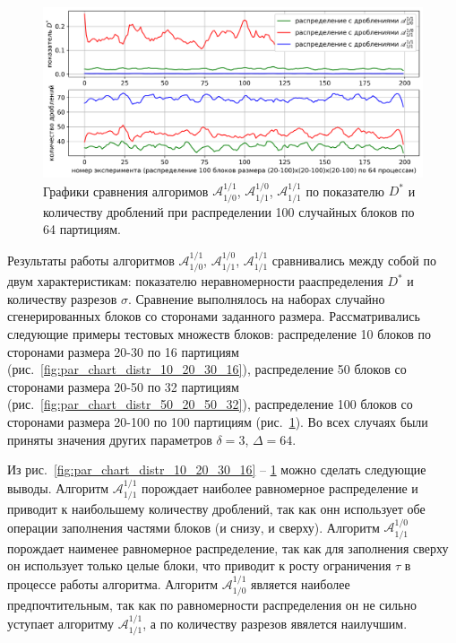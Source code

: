 \begin{figure}[!h]
\centering
\includegraphics[width=1.0\textwidth]{fig/par_chart_distr_100_20_100_64.png}
\singlespacing
{}\caption{Графики сравнения алгоримов $\mathscr{A}_{1/0}^{1/1}$, $\mathscr{A}_{1/1}^{1/0}$, $\mathscr{A}_{1/1}^{1/1}$ по показателю $D^{*}$ и количеству дроблений при распределении 100 случайных блоков по 64 партициям.}
\label{fig:par_chart_distr_100_20_100_64}
\end{figure}

Результаты работы алгоритмов $\mathscr{A}_{1/0}^{1/1}$, $\mathscr{A}_{1/1}^{1/0}$, $\mathscr{A}_{1/1}^{1/1}$ сравнивались между собой по двум характеристикам: показателю неравномерности рааспределения $D^{*}$ и количеству разрезов $\sigma$.
Сравнение выполнялось на наборах случайно сгенерированных блоков со сторонами заданного размера.
Рассматривались следующие примеры тестовых множеств блоков: распределение 10 блоков по сторонами размера 20-30 по 16 партициям (рис.~\ref{fig:par_chart_distr_10_20_30_16}), распределение 50 блоков со сторонами размера 20-50 по 32 партициям (рис.~\ref{fig:par_chart_distr_50_20_50_32}), распределение 100 блоков со сторонами размера 20-100 по 100 партициям (рис.~\ref{fig:par_chart_distr_100_20_100_64}).
Во всех случаях были приняты значения других параметров $\delta = 3$, $\Delta = 64$.

Из рис.~\ref{fig:par_chart_distr_10_20_30_16} -- \ref{fig:par_chart_distr_100_20_100_64} можно сделать следующие выводы.
Алгоритм $\mathscr{A}_{1/1}^{1/1}$ порождает наиболее равномерное распределение и приводит к наибольшему количеству дроблений, так как онн использует обе операции заполнения частями блоков (и снизу, и сверху).
Алгоритм $\mathscr{A}_{1/1}^{1/0}$ порождает наименее равномерное распределение, так как для заполнения сверху он использует только целые блоки, что приводит к росту ограничения $\tau$ в процессе работы алгоритма.
Алгоритм $\mathscr{A}_{1/0}^{1/1}$ является наиболее предпочтительным, так как по равномерности распределения он не сильно уступает алгоритму $\mathscr{A}_{1/1}^{1/1}$, а по количеству разрезов явялется наилучшим.

